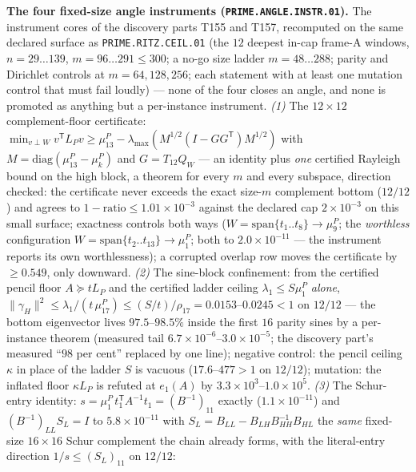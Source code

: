 \par\smallskip\noindent\textbf{The four fixed-size angle instruments
(\texttt{PRIME.ANGLE.INSTR.01}).}
The instrument cores of the discovery parts T155 and T157, recomputed on
the same declared surface as \texttt{PRIME.RITZ.CEIL.01} (the $12$
deepest in-cap frame-A windows, $n=29\ldots139$, $m=96\ldots291\le300$;
a no-go size ladder $m=48\ldots288$; parity and Dirichlet controls at
$m=64,128,256$; each statement with at least one mutation control that
must fail loudly) --- none of the four closes an angle, and none is
promoted as anything but a per-instance instrument. \emph{(1)} The
$12\times12$ complement-floor certificate:
$\min_{v\perp W}v^{\mathsf T}L_Pv\ge\mu^P_{13}-\lambda_{\max}(M^{1/2}
(I-GG^{\mathsf T})M^{1/2})$ with $M=\mathrm{diag}(\mu^P_{13}-\mu^P_k)$
and $G=T_{12}Q_W$ --- an identity plus \emph{one} certified Rayleigh
bound on the high block, a theorem for every $m$ and every subspace,
direction checked: the certificate never exceeds the exact size-$m$
complement bottom ($12/12$) and agrees to $1-\mathrm{ratio}\le1.01
\times10^{-3}$ against the declared cap $2\times10^{-3}$ on this small
surface; exactness controls both ways ($W=\mathrm{span}\{t_1..t_8\}\to
\mu^P_9$; the \emph{worthless} configuration $W=\mathrm{span}
\{t_2..t_{13}\}\to\mu^P_1$; both to $2.0\times10^{-11}$ --- the
instrument reports its own worthlessness); a corrupted overlap row moves
the certificate by $\ge0.549$, only downward. \emph{(2)} The sine-block
confinement: from the certified pencil floor $A\succeq tL_P$ and the
certified ladder ceiling $\lambda_1\le S\mu^P_1$ \emph{alone},
$\|\gamma_H\|^2\le\lambda_1/(t\,\mu^P_{17})\le(S/t)/\rho_{17}
=0.0153$--$0.0245<1$ on $12/12$ --- the bottom eigenvector lives
$97.5$--$98.5\%$ inside the first $16$ parity sines by a per-instance
theorem (measured tail $6.7\times10^{-6}$--$3.0\times10^{-5}$; the
discovery part's measured ``$98$ per cent'' replaced by one line);
negative control: the pencil ceiling $\kappa$ in place of the ladder $S$
is vacuous ($17.6$--$477>1$ on $12/12$); mutation: the inflated floor
$\kappa L_P$ is refuted at $e_1(A)$ by $3.3\times10^{3}$--$1.0\times
10^{5}$. \emph{(3)} The Schur-entry identity:
$s=\mu^P_1\,t_1^{\mathsf T}A^{-1}t_1=(B^{-1})_{11}$ exactly
($1.1\times10^{-11}$) and $(B^{-1})_{LL}S_L=I$ to $5.8\times10^{-11}$
with $S_L=B_{LL}-B_{LH}B_{HH}^{-1}B_{HL}$ the \emph{same} fixed-size
$16\times16$ Schur complement the chain already forms, with the
literal-entry direction $1/s\le(S_L)_{11}$ on $12/12$:
